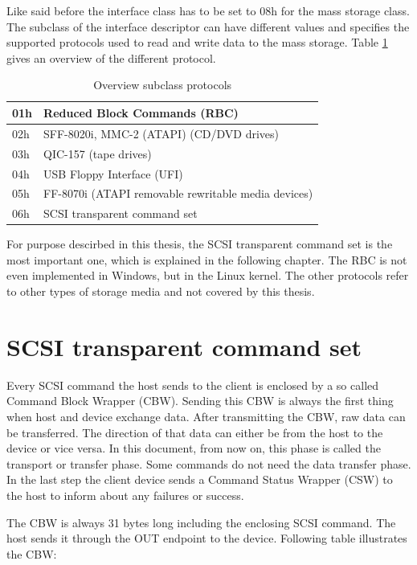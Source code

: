 Like said before the interface class has to be set to 08h for the mass storage class. The subclass of the interface descriptor can have different values and specifies the supported protocols used to read and write data to the mass storage. Table \ref{table:subclass} gives an overview of the different protocol.

\begin{table}[ht]
\caption{Overview subclass protocols \cite{usb_ms_jan}}
\centering
\begin{tabular}{|l|l|}
\hline\hline
01h & Reduced Block Commands (RBC) \\ \hline
02h & SFF-8020i, MMC-2 (ATAPI) (CD/DVD drives) \\ \hline
03h & QIC-157 (tape drives) \\ \hline
04h & USB Floppy Interface (UFI) \\ \hline
05h & FF-8070i (ATAPI removable rewritable media devices) \\ \hline
06h & SCSI transparent command set \\ \hline
\end{tabular}
\label{table:subclass}
\end{table}

For purpose descirbed in this thesis, the SCSI transparent command set is the most important one, which is explained in the following chapter. The RBC is not even implemented in Windows, but in the Linux kernel\cite{usb_ms_jan}. The other protocols refer to other types of storage media and not covered by this thesis.

\section{SCSI transparent command set}

Every SCSI command the host sends to the client is enclosed by a so called Command Block Wrapper (CBW). Sending this CBW is always the first thing when host and device exchange data. After transmitting the CBW, raw data can be transferred. The direction of that data can either be from the host to the device or vice versa. In this document, from now on, this phase is called the transport or transfer phase. Some commands do not need the data transfer phase. In the last step the client device sends a Command Status Wrapper (CSW) to the host to inform about any failures or success.

The CBW is always 31 bytes long including the enclosing SCSI command. The host sends it through the OUT endpoint to the device. Following table illustrates the CBW:

